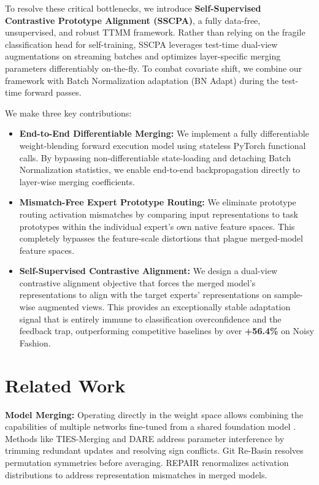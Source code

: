\documentclass{article}
\theoremstyle{plain}
\theoremstyle{definition}
\theoremstyle{remark}
\begin{document}
To resolve these critical bottlenecks, we introduce \textbf{Self-Supervised Contrastive Prototype Alignment (SSCPA)}, a fully data-free, unsupervised, and robust TTMM framework. Rather than relying on the fragile classification head for self-training, SSCPA leverages test-time dual-view augmentations on streaming batches and optimizes layer-specific merging parameters differentiably on-the-fly. To combat covariate shift, we combine our framework with Batch Normalization adaptation (BN Adapt) during the test-time forward passes.

We make three key contributions:
\begin{itemize}
    \item \textbf{End-to-End Differentiable Merging:} We implement a fully differentiable weight-blending forward execution model using stateless PyTorch functional calls. By bypassing non-differentiable state-loading and detaching Batch Normalization statistics, we enable end-to-end backpropagation directly to layer-wise merging coefficients.
    \item \textbf{Mismatch-Free Expert Prototype Routing:} We eliminate prototype routing activation mismatches by comparing input representations to task prototypes within the individual expert's own native feature spaces. This completely bypasses the feature-scale distortions that plague merged-model feature spaces.
    \item \textbf{Self-Supervised Contrastive Alignment:} We design a dual-view contrastive alignment objective that forces the merged model's representations to align with the target experts' representations on sample-wise augmented views. This provides an exceptionally stable adaptation signal that is entirely immune to classification overconfidence and the feedback trap, outperforming competitive baselines by over \textbf{+56.4\%} on Noisy Fashion.
\end{itemize}

\section{Related Work}
\label{sec:related}
\textbf{Model Merging:} Operating directly in the weight space allows combining the capabilities of multiple networks fine-tuned from a shared foundation model \cite{wortsman22, ilharco23, cha2021swad}. Methods like TIES-Merging \cite{yadav23} and DARE \cite{yu-dong23} address parameter interference by trimming redundant updates and resolving sign conflicts. Git Re-Basin \cite{ainsworth23} resolves permutation symmetries before averaging. REPAIR \cite{jordan22} renormalizes activation distributions to address representation mismatches in merged models.
\end{document}
